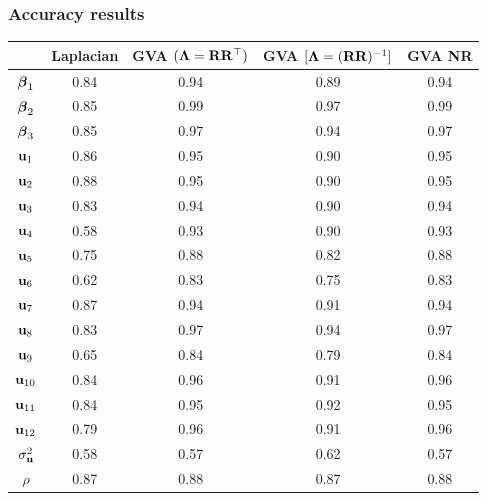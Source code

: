 \documentclass{beamer}
\begin{document}
	\begin{frame}
		\frametitle{Accuracy results}
		\begin{tabular}{|c|cccc|}
			\hline
			               & Laplacian & GVA $({\boldsymbol \Lambda}={\bf R} {\bf R}^\top)$ & GVA $[{\boldsymbol \Lambda}=({\bf R} {\bf R})^{-1}]$ & GVA NR \\
			\hline
			${\boldsymbol \beta}_1$     & 0.84      & 0.94                          & 0.89                            & 0.94   \\
			${\boldsymbol \beta}_2$     & 0.85      & 0.99                          & 0.97                            & 0.99   \\
			${\boldsymbol \beta}_3$     & 0.85      & 0.97                          & 0.94                            & 0.97   \\
			${\bf u}_1$        & 0.86      & 0.95                          & 0.90                            & 0.95   \\
			${\bf u}_2$        & 0.88      & 0.95                          & 0.90                            & 0.95   \\
			${\bf u}_3$        & 0.83      & 0.94                          & 0.90                            & 0.94   \\
			${\bf u}_4$        & 0.58      & 0.93                          & 0.90                            & 0.93   \\
			${\bf u}_5$        & 0.75      & 0.88                          & 0.82                            & 0.88   \\
			${\bf u}_6$        & 0.62      & 0.83                          & 0.75                            & 0.83   \\
			${\bf u}_7$        & 0.87      & 0.94                          & 0.91                            & 0.94   \\
			${\bf u}_8$        & 0.83      & 0.97                          & 0.94                            & 0.97   \\
			${\bf u}_9$        & 0.65      & 0.84                          & 0.79                            & 0.84   \\
			${\bf u}_{10}$     & 0.84      & 0.96                          & 0.91                            & 0.96   \\
			${\bf u}_{11}$     & 0.84      & 0.95                          & 0.92                            & 0.95   \\
			${\bf u}_{12}$     & 0.79      & 0.96                          & 0.91                            & 0.96   \\
			$\sigma_{\bf u}^2$ & 0.58      & 0.57                          & 0.62                            & 0.57   \\
			$\rho$         & 0.87      & 0.88                          & 0.87                            & 0.88   \\
			\hline
		\end{tabular}
	\end{frame}
	
\end{document}
